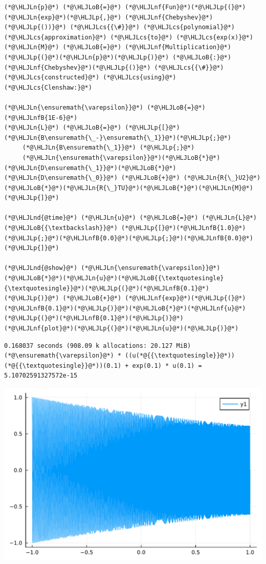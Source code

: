 \documentclass[12pt,a4paper]{article}
\newcommand{\HLJLn}[1]{#1}
\newcommand{\HLJLnd}[1]{\textcolor[RGB]{214,102,97}{#1}}
\newcommand{\HLJLnf}[1]{\textcolor[RGB]{66,102,213}{#1}}
\newcommand{\HLJLnfB}[1]{\textcolor[RGB]{59,151,46}{#1}}
\newcommand{\HLJLoB}[1]{\textcolor[RGB]{102,102,102}{\textbf{#1}}}
\newcommand{\HLJLp}[1]{#1}
\newcommand{\HLJLcs}[1]{\textcolor[RGB]{153,153,119}{\textit{#1}}}
\begin{document}
\begin{lstlisting}
(*@\HLJLn{p}@*) (*@\HLJLoB{=}@*) (*@\HLJLnf{Fun}@*)(*@\HLJLp{(}@*)(*@\HLJLn{exp}@*)(*@\HLJLp{,}@*) (*@\HLJLnf{Chebyshev}@*)(*@\HLJLp{())}@*) (*@\HLJLcs{{\#}}@*) (*@\HLJLcs{polynomial}@*) (*@\HLJLcs{approximation}@*) (*@\HLJLcs{to}@*) (*@\HLJLcs{exp(x)}@*)
(*@\HLJLn{M}@*) (*@\HLJLoB{=}@*) (*@\HLJLnf{Multiplication}@*)(*@\HLJLp{(}@*)(*@\HLJLn{p}@*)(*@\HLJLp{)}@*) (*@\HLJLoB{:}@*) (*@\HLJLnf{Chebyshev}@*)(*@\HLJLp{()}@*) (*@\HLJLcs{{\#}}@*) (*@\HLJLcs{constructed}@*) (*@\HLJLcs{using}@*) (*@\HLJLcs{Clenshaw:}@*)

(*@\HLJLn{\ensuremath{\varepsilon}}@*) (*@\HLJLoB{=}@*) (*@\HLJLnfB{1E-6}@*)
(*@\HLJLn{L}@*) (*@\HLJLoB{=}@*) (*@\HLJLp{[}@*)(*@\HLJLn{B\ensuremath{\_-}\ensuremath{\_1}}@*)(*@\HLJLp{;}@*)
     (*@\HLJLn{B\ensuremath{\_1}}@*) (*@\HLJLp{;}@*)
     (*@\HLJLn{\ensuremath{\varepsilon}}@*)(*@\HLJLoB{*}@*)(*@\HLJLn{D\ensuremath{\_1}}@*)(*@\HLJLoB{*}@*)(*@\HLJLn{D\ensuremath{\_0}}@*) (*@\HLJLoB{+}@*) (*@\HLJLn{R{\_}U2}@*)(*@\HLJLoB{*}@*)(*@\HLJLn{R{\_}TU}@*)(*@\HLJLoB{*}@*)(*@\HLJLn{M}@*)(*@\HLJLp{]}@*)

(*@\HLJLnd{@time}@*) (*@\HLJLn{u}@*) (*@\HLJLoB{=}@*) (*@\HLJLn{L}@*) (*@\HLJLoB{{\textbackslash}}@*) (*@\HLJLp{[}@*)(*@\HLJLnfB{1.0}@*)(*@\HLJLp{;}@*)(*@\HLJLnfB{0.0}@*)(*@\HLJLp{;}@*)(*@\HLJLnfB{0.0}@*)(*@\HLJLp{]}@*)

(*@\HLJLnd{@show}@*) (*@\HLJLn{\ensuremath{\varepsilon}}@*)(*@\HLJLoB{*}@*)(*@\HLJLn{u}@*)(*@\HLJLoB{{\textquotesingle}{\textquotesingle}}@*)(*@\HLJLp{(}@*)(*@\HLJLnfB{0.1}@*)(*@\HLJLp{)}@*) (*@\HLJLoB{+}@*) (*@\HLJLnf{exp}@*)(*@\HLJLp{(}@*)(*@\HLJLnfB{0.1}@*)(*@\HLJLp{)}@*)(*@\HLJLoB{*}@*)(*@\HLJLnf{u}@*)(*@\HLJLp{(}@*)(*@\HLJLnfB{0.1}@*)(*@\HLJLp{)}@*)
(*@\HLJLnf{plot}@*)(*@\HLJLp{(}@*)(*@\HLJLn{u}@*)(*@\HLJLp{)}@*)
\end{lstlisting}

\begin{lstlisting}
0.168037 seconds (908.09 k allocations: 20.127 MiB)
(*@\ensuremath{\varepsilon}@*) * ((u(*@{{\textquotesingle}}@*))(*@{{\textquotesingle}}@*))(0.1) + exp(0.1) * u(0.1) = 5.10702591327572e-15
\end{lstlisting}

\includegraphics[width=\linewidth]{jl_dOthw0/OP_methods_47_1.pdf}
\end{document}
